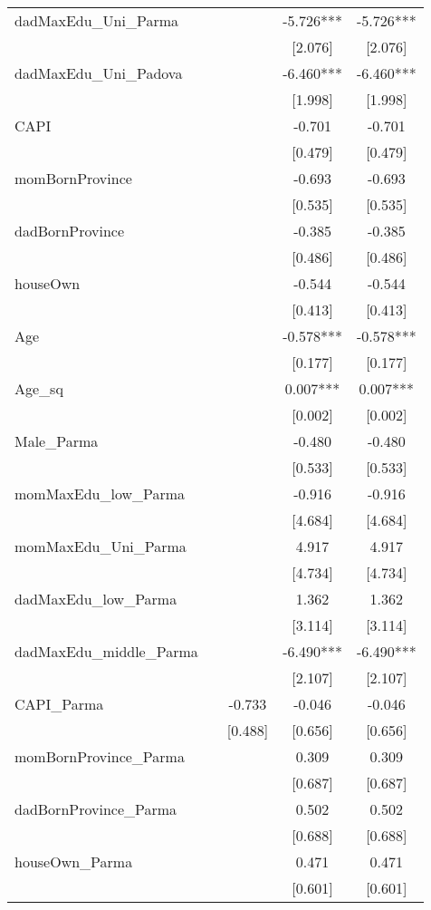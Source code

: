 \documentclass[]{article}
\begin{document}
\begin{tabular}{lcccc}
dadMaxEdu\_Uni\_Parma &  &  & -5.726*** & -5.726*** \\
 &  &  & [2.076] & [2.076] \\
dadMaxEdu\_Uni\_Padova &  &  & -6.460*** & -6.460*** \\
 &  &  & [1.998] & [1.998] \\
CAPI &  &  & -0.701 & -0.701 \\
 &  &  & [0.479] & [0.479] \\
momBornProvince &  &  & -0.693 & -0.693 \\
 &  &  & [0.535] & [0.535] \\
dadBornProvince &  &  & -0.385 & -0.385 \\
 &  &  & [0.486] & [0.486] \\
houseOwn &  &  & -0.544 & -0.544 \\
 &  &  & [0.413] & [0.413] \\
Age &  &  & -0.578*** & -0.578*** \\
 &  &  & [0.177] & [0.177] \\
Age\_sq &  &  & 0.007*** & 0.007*** \\
 &  &  & [0.002] & [0.002] \\
Male\_Parma &  &  & -0.480 & -0.480 \\
 &  &  & [0.533] & [0.533] \\
momMaxEdu\_low\_Parma &  &  & -0.916 & -0.916 \\
 &  &  & [4.684] & [4.684] \\
momMaxEdu\_Uni\_Parma &  &  & 4.917 & 4.917 \\
 &  &  & [4.734] & [4.734] \\
dadMaxEdu\_low\_Parma &  &  & 1.362 & 1.362 \\
 &  &  & [3.114] & [3.114] \\
dadMaxEdu\_middle\_Parma &  &  & -6.490*** & -6.490*** \\
 &  &  & [2.107] & [2.107] \\
CAPI\_Parma &  & -0.733 & -0.046 & -0.046 \\
 &  & [0.488] & [0.656] & [0.656] \\
momBornProvince\_Parma &  &  & 0.309 & 0.309 \\
 &  &  & [0.687] & [0.687] \\
dadBornProvince\_Parma &  &  & 0.502 & 0.502 \\
 &  &  & [0.688] & [0.688] \\
houseOwn\_Parma &  &  & 0.471 & 0.471 \\
 &  &  & [0.601] & [0.601] \\

\end{tabular}
\end{document}
